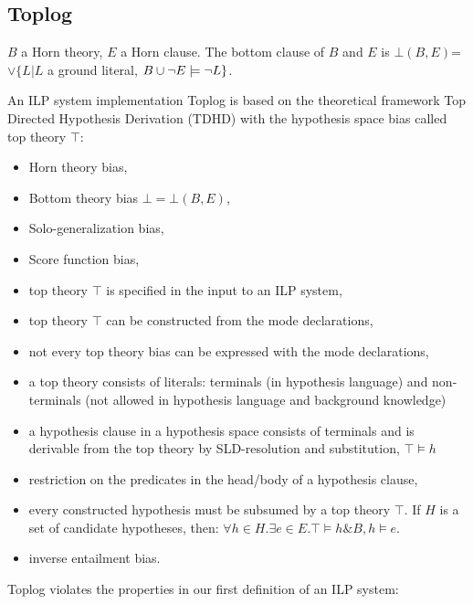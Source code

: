 \subsection{Toplog\cite{muggleton2008toplog}}
\begin{defn}
$B$ a Horn theory, $E$ a Horn clause. The bottom clause of $B$ and $E$ is $\bot(B,E)$=$\vee\{L | L $ a ground literal, $B \cup {\neg E} \models \neg L\}$.
\end{defn}
An ILP system implementation Toplog is based on the theoretical framework Top Directed Hypothesis Derivation (TDHD) with the hypothesis space bias called top theory $\top$:
\begin{itemize}
\item Horn theory bias,
\item Bottom theory bias $\bot = \bot(B,E)$,
\item Solo-generalization bias,
\item Score function bias,
\item top theory $\top$ is specified in the input to an ILP system,
\item top theory $\top$ can be constructed from the mode declarations,
\item not every top theory bias can be expressed with the mode declarations,
\item a top theory consists of literals: terminals (in hypothesis language) and non-terminals (not allowed in hypothesis language and background knowledge)
\item a hypothesis clause in a hypothesis space consists of terminals and is derivable from the top theory by SLD-resolution and substitution, $\top \models h$
\item restriction on the predicates in the head/body of a hypothesis clause,
\item every constructed hypothesis must be subsumed by a top theory $\top$. If $H$ is a set of candidate hypotheses, then: $\forall h \in H. \exists e \in E. \top \models h \& B, h \models e$.
\item inverse entailment bias.
\end{itemize}
Toplog violates the properties in our first definition of an ILP system:
